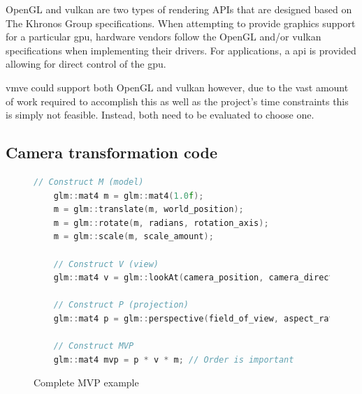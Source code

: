 \documentclass[11pt]{article}
\begin{document}
OpenGL and \gls*{vulkan} are two types of rendering APIs that are designed based on
The Khronos Group specifications. When attempting to provide graphics support
for a particular \gls*{gpu}, hardware vendors follow the OpenGL and/or \gls*{vulkan}
specifications when implementing their drivers. For applications, a
\gls*{api} is provided allowing for direct control of the \gls*{gpu}.

\gls*{vmve} could support both OpenGL and \gls*{vulkan} however, due to the vast
amount of work required to accomplish this as well as the project's time
constraints this is simply not feasible. Instead, both need to be evaluated to
choose one.


\subsection{Camera transformation code}
\begin{figure}[ht]
  \centering
  \begin{lstlisting}[language=C++]
    // Construct M (model)
    glm::mat4 m = glm::mat4(1.0f);
    m = glm::translate(m, world_position);   
    m = glm::rotate(m, radians, rotation_axis); 
    m = glm::scale(m, scale_amount);

    // Construct V (view)
    glm::mat4 v = glm::lookAt(camera_position, camera_direction, camera_up);

    // Construct P (projection)
    glm::mat4 p = glm::perspective(field_of_view, aspect_ratio, near, far);

    // Construct MVP
    glm::mat4 mvp = p * v * m; // Order is important

  \end{lstlisting}
  \caption{Complete MVP example}
  \label{fig:local_to_world_appendix}
\end{figure}
\end{document}
